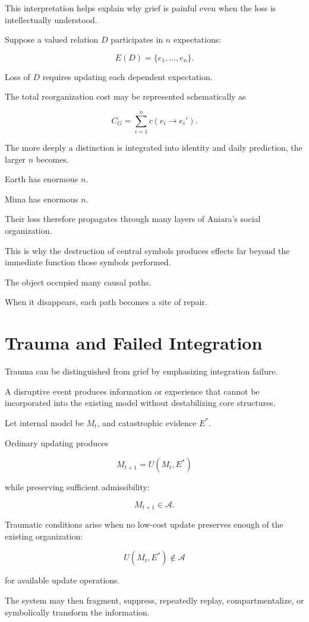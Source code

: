 \documentclass[11pt,oneside]{book}
\theoremstyle{definition}
\theoremstyle{remark}
\newcommand{\A}{\mathcal{A}}
\begin{document}
This interpretation helps explain why grief is painful even when the loss is intellectually understood.

Suppose a valued relation \(D\) participates in \(n\) expectations:

\[
E(D)
=
\{e_1,\ldots,e_n\}.
\]

Loss of \(D\) requires updating each dependent expectation.

The total reorganization cost may be represented schematically as

\[
C_G
=
\sum_{i=1}^{n}
c(e_i\rightarrow e_i').
\]

The more deeply a distinction is integrated into identity and daily prediction, the larger \(n\) becomes.

Earth has enormous \(n\).

Mima has enormous \(n\).

Their loss therefore propagates through many layers of Aniara's social organization.

This is why the destruction of central symbols produces effects far beyond the immediate function those symbols performed.

The object occupied many causal paths.

When it disappears, each path becomes a site of repair.

\section{Trauma and Failed Integration}

Trauma can be distinguished from grief by emphasizing integration failure.

A disruptive event produces information or experience that cannot be incorporated into the existing model without destabilizing core structures.

Let internal model be \(M_t\), and catastrophic evidence \(E^\ast\).

Ordinary updating produces

\[
M_{t+1}=U(M_t,E^\ast)
\]

while preserving sufficient admissibility:

\[
M_{t+1}\in\A.
\]

Traumatic conditions arise when no low-cost update preserves enough of the existing organization:

\[
U(M_t,E^\ast)\notin\A
\]

for available update operations.

The system may then fragment, suppress, repeatedly replay, compartmentalize, or symbolically transform the information.
\end{document}
